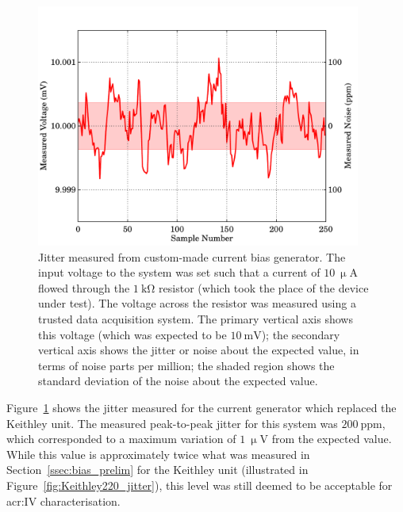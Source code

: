 \begin{figure}[t]
\begin{center}
\includegraphics[width = 0.95\textwidth]{figures/RTD_currGen_jitter}
\caption[Jitter from initial, custom-made current bias system.]{Jitter measured from custom-made current bias generator. The input voltage to the system was set such that a current of $10~\mathrm{\upmu A}$ flowed through the $1~\mathrm{k\Omega}$ resistor (which took the place of the device under test). The voltage across the resistor was measured using a trusted data acquisition system. The primary vertical axis shows this voltage (which was expected to be $10~\mathrm{mV}$); the secondary vertical axis shows the jitter or noise about the expected value, in terms of noise parts per million; the shaded region shows the standard deviation of the noise about the expected value.}
\label{fig:RTD_currGen_jitter}
\end{center}
\end{figure}
\par 
Figure~\ref{fig:RTD_currGen_jitter} shows the jitter measured for the current generator which replaced the Keithley unit. The measured peak-to-peak jitter for this system was $200~\mathrm{ppm}$, which corresponded to a maximum variation of $1~\mathrm{\upmu V}$ from the expected value. While this value is approximately twice what was measured in Section~\ref{ssec:bias_prelim} for the Keithley unit (illustrated in Figure~\ref{fig:Keithley220_jitter}), this level was still deemed to be acceptable for \gls{acr:IV} characterisation.

